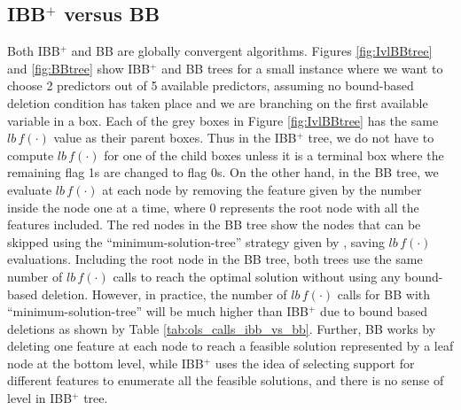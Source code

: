 \documentclass[10pt, letterpaper]{article}
\begin{document}
\subsection{IBB$^{+}$ versus BB}
\label{sec:ibb_vs_bb}
Both IBB$^{+}$ and BB are globally convergent algorithms. Figures \ref{fig:IvlBBtree} and \ref{fig:BBtree} show IBB$^{+}$ and BB trees for a small instance where we want to choose 2 predictors out of 5 available predictors, assuming no bound-based deletion condition has taken place and we are branching on the first available variable in a box. Each of the grey boxes in Figure \ref{fig:IvlBBtree} has the same $lb \, f(\cdot)$ value as their parent boxes. Thus in the IBB$^{+}$ tree, we do not have to compute $lb \, f(\cdot)$ for one of the child boxes unless it is a terminal box where the remaining flag 1s are changed to flag 0s. On the other hand, in the BB tree, we evaluate $lb \, f(\cdot)$ at each node by removing the feature given by the number inside the node one at a time, where $0$ represents the root node with all the features included. The red nodes in the BB tree show the nodes that can be skipped using the ``minimum-solution-tree'' strategy given by \cite{yu1993more}, saving $lb \, f(\cdot)$ evaluations. Including the root node in the BB tree, both trees use the same number of $lb \, f(\cdot)$ calls to reach the optimal solution without using any bound-based deletion. However, in practice, the number of $lb \, f(\cdot)$ calls for BB with ``minimum-solution-tree'' will be much higher than IBB$^{+}$ due to bound based deletions as shown by Table \ref{tab:ols_calls_ibb_vs_bb}. Further, BB works by deleting one feature at each node to reach a feasible solution represented by a leaf node at the bottom level, while IBB$^{+}$ uses the idea of selecting support for different features to enumerate all the feasible solutions, and there is no sense of level in IBB$^{+}$ tree. 
\end{document}
